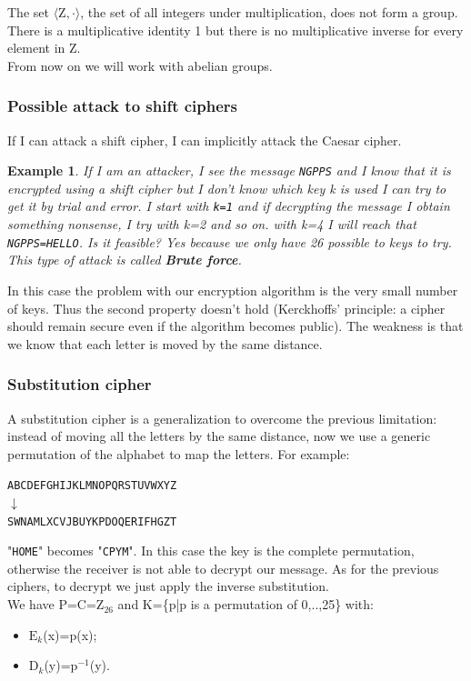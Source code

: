 \documentclass[a4paper, 12pt]{report}
\newtheorem{example}{\textbf{Example}}
\begin{document}
\vspace{5mm}
The set $\langle\textrm{Z},\cdot\rangle$, the set of all integers under multiplication, does not form a group. There is a multiplicative identity 1 but there is no multiplicative inverse for every element in Z.\\

From now on we will work with abelian groups.

\subsubsection{Possible attack to shift ciphers}
If I can attack a shift cipher, I can implicitly attack the Caesar cipher.
\begin{example}
	If I am an attacker, I see the message \texttt{NGPPS} and I know that it is encrypted using a shift cipher but I don't know which key k is used I can try to get it by trial and error. I start with \texttt{k=1} and if decrypting the message I obtain something nonsense, I try with k=2 and so on. with k=4 I will reach that \texttt{NGPPS=HELLO}. Is it feasible? Yes because we only have 26 possible to keys to try. This type of attack is called \textbf{Brute force}.
\end{example}

In this case the problem with our encryption algorithm is the very small number of keys. Thus the second property doesn't hold (Kerckhoffs' principle: a cipher should remain secure even if the algorithm becomes public). The weakness is that we know that each letter is moved by the same distance.

\subsubsection{Substitution cipher}
A substitution cipher is a generalization to overcome the previous limitation: instead of moving all the letters by the same distance, now we use a generic permutation of the alphabet to map the letters. For example:
\begin{center}
	\texttt{ABCDEFGHIJKLMNOPQRSTUVWXYZ}\\
	$\downarrow$\\
	\texttt{SWNAMLXCVJBUYKPDOQERIFHGZT}
\end{center}
"\texttt{HOME}" becomes "\texttt{CPYM}". In this case the key is the complete permutation, otherwise the receiver is not able to decrypt our message. As for the previous ciphers, to decrypt we just apply the inverse substitution.\\
We have P=C=$\textrm{Z}_{26}$ and K=\{p|p is a permutation of 0,..,25\} with:
\begin{itemize}
	\item $\textrm{E}_k$(x)=p(x);
	\item $\textrm{D}_k$(y)=$\textrm{p}^{-1}$(y).
\end{itemize}
\end{document}
